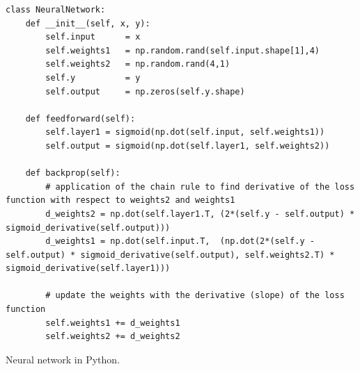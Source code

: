 \documentclass[letterpaper,12pt]{article}
\begin{document}
\begin{appendices}
\begin{listing}[ht]
\begin{verbatim}
class NeuralNetwork:
    def __init__(self, x, y):
        self.input      = x
        self.weights1   = np.random.rand(self.input.shape[1],4) 
        self.weights2   = np.random.rand(4,1)                 
        self.y          = y
        self.output     = np.zeros(self.y.shape)

    def feedforward(self):
        self.layer1 = sigmoid(np.dot(self.input, self.weights1))
        self.output = sigmoid(np.dot(self.layer1, self.weights2))

    def backprop(self):
        # application of the chain rule to find derivative of the loss function with respect to weights2 and weights1
        d_weights2 = np.dot(self.layer1.T, (2*(self.y - self.output) * sigmoid_derivative(self.output)))
        d_weights1 = np.dot(self.input.T,  (np.dot(2*(self.y - self.output) * sigmoid_derivative(self.output), self.weights2.T) * sigmoid_derivative(self.layer1)))

        # update the weights with the derivative (slope) of the loss function
        self.weights1 += d_weights1
        self.weights2 += d_weights2
\end{verbatim}
\caption{Neural network in Python.}
\label{lst:standardise}
\end{listing}



\end{appendices}
\end{document}
